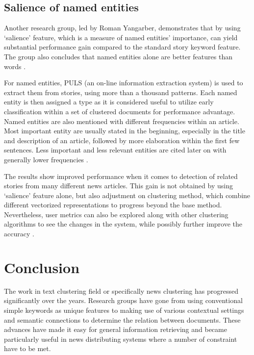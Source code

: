 \documentclass[english]{tktltiki}
\begin{document}
\subsection{Salience of named entities}

Another research group, led by Roman Yangarber, demonstrates that by using `salience' feature, which is a measure of named entities' importance, can yield substantial performance gain compared to the standard story keyword feature. The group also concludes that named entities alone are better features than words \cite[p.~1096]{Yangarber2017GroupingBN}.

For named entities, PULS (an on-line information extraction system) is used to extract them from stories, using more than a thousand patterns. Each named entity is then assigned a type as it is considered useful to utilize early classification within a set of clustered documents for performance advantage. Named entities are also mentioned with different frequencies within an article. Most important entity are usually stated in the beginning, especially in the title and description of an article, followed by more elaboration within the first few sentences. Less important and less relevant entities are cited later on with generally lower frequencies \cite[p.~1098]{Yangarber2017GroupingBN}.

The results show improved performance when it comes to detection of related stories from many different news articles. This gain is not obtained by using `salience' feature alone, but also adjustment on clustering method, which combine different vectorized representations to progress beyond the base method. Nevertheless, user metrics can also be explored along with other clustering algorithms to see the changes in the system, while possibly further improve the accuracy \cite[p.~1104]{Yangarber2017GroupingBN}.

\pagebreak

\section{Conclusion}

The work in text clustering field or specifically news clustering has progressed significantly over the years. Research groups have gone from using conventional simple keywords as unique features to making use of various contextual settings and semantic connections to determine the relation between documents. These advances have made it easy for general information retrieving and became particularly useful in news distributing systems where a number of constraint have to be met.
\end{document}
